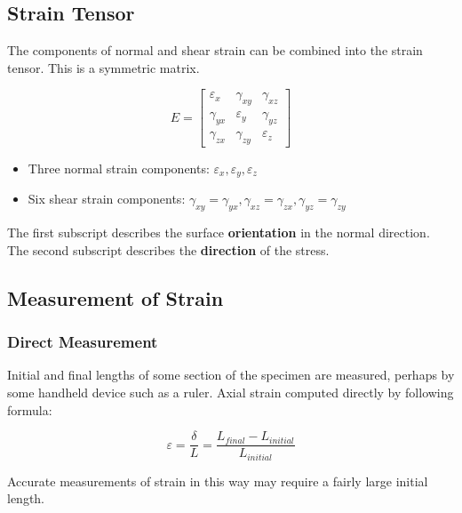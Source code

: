 \subsection{Strain Tensor}
The components of normal and shear strain can be combined into the strain tensor. This is a symmetric matrix.

\[ E = \begin{bmatrix} \varepsilon_{x} & \gamma_{xy} & \gamma_{xz} \\ \gamma_{yx} & \varepsilon_{y} &\gamma_{yz} \\ \gamma_{zx} & \gamma_{zy} &\varepsilon_{z} \end{bmatrix} \]



\begin{itemize}
    \item  Three normal strain components: $\varepsilon_x, \varepsilon_y, \varepsilon_z$
    \item Six shear strain components: $\gamma_{xy} =\gamma_{yx}, \gamma_{xz}=\gamma_{zx}, \gamma_{yz}=\gamma_{zy}$
\end{itemize}


\noindent The first subscript describes the surface \textbf{orientation} in the normal direction. The second subscript describes the \textbf{direction} of the stress.

\subsection{Measurement of Strain}

\subsubsection{Direct Measurement}

Initial and final lengths of some section of the specimen are measured, perhaps by some handheld device such as a ruler. Axial strain computed directly by following formula:

\[\varepsilon = \frac{\delta}{L} = \frac{L_{final} - L_{initial}}{L_{initial}} \]

\noindent Accurate measurements of strain in this way may require a fairly large initial length.

